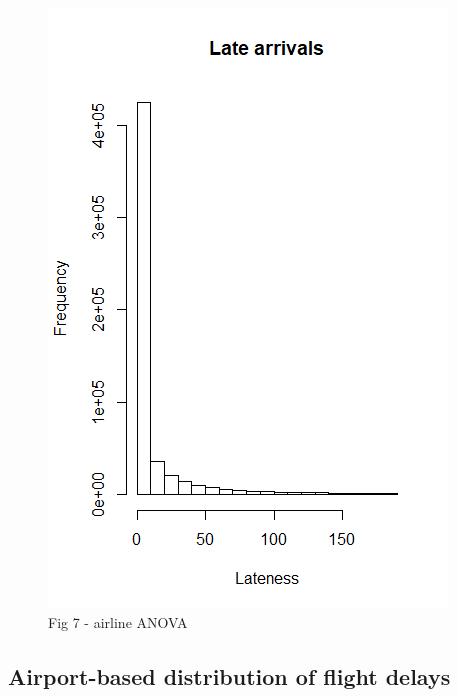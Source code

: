 \documentclass[12pt, a4paper]{book}
\begin{document}
	 		\begin{figure}[h]
	 		\includegraphics[width = 1 \textwidth]{../figures/LateArrivalsHistogram}
	 		\caption{Fig 7 - airline ANOVA}
	 		\end{figure}

		\subsection{Airport-based distribution of flight delays}
			
\end{document}
